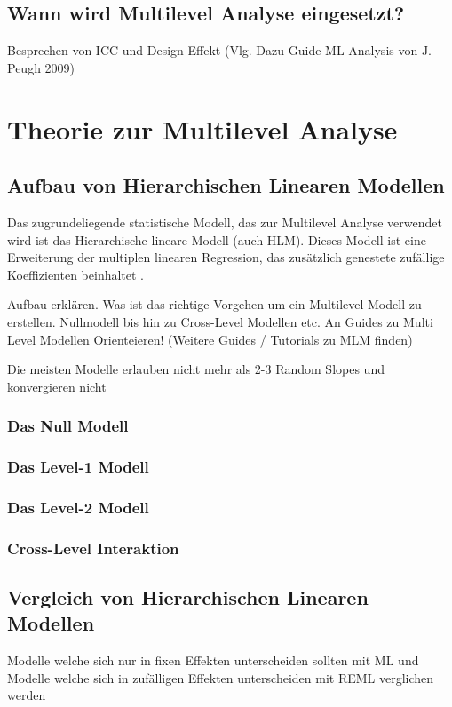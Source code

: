 \documentclass[12pt]{article}\usepackage[]{graphicx}\usepackage[]{color}
\begin{document}
\subsection{Wann wird Multilevel Analyse eingesetzt?}
Besprechen von ICC und Design Effekt (Vlg. Dazu Guide ML Analysis von J. Peugh 2009)

\section{Theorie zur Multilevel Analyse}


\subsection{Aufbau von Hierarchischen Linearen Modellen}
Das zugrundeliegende statistische Modell, das zur Multilevel Analyse verwendet wird ist das Hierarchische lineare Modell (auch HLM). Dieses Modell ist eine Erweiterung der multiplen linearen Regression, das zusätzlich genestete zufällige Koeffizienten beinhaltet \cite{SnijdersTomA.B2012Ma:a}.

Aufbau erklären. Was ist das richtige Vorgehen um ein Multilevel Modell zu erstellen. Nullmodell bis hin zu Cross-Level Modellen etc. An Guides zu Multi Level Modellen Orienteieren! \cite{SnijdersTomA.B2012Ma:a} (Weitere Guides / Tutorials zu MLM finden)

Die meisten Modelle erlauben nicht mehr als 2-3 Random Slopes und konvergieren nicht \cite{SnijdersTomA.B2012Ma:a}


\subsubsection{Das Null Modell}
\subsubsection{Das Level-1 Modell}
\subsubsection{Das Level-2 Modell}
\subsubsection{Cross-Level Interaktion}

\subsection{Vergleich von Hierarchischen Linearen Modellen}
Modelle welche sich nur in fixen Effekten unterscheiden sollten mit ML und Modelle welche sich in zufälligen Effekten unterscheiden mit REML verglichen werden \cite{SnijdersTomA.B2012Ma:a}
\end{document}
